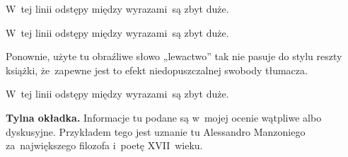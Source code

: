 \documentclass[a4paper,11pt]{article}
\numberwithin{equation}{section}
\begin{document}
\noindent
{} W~tej linii odstępy między wyrazami~są zbyt duże.

\VerSpaceFour





\noindent
{} W~tej linii odstępy między wyrazami~są zbyt duże.

\VerSpaceFour





\noindent
{} Ponownie, użyte tu obraźliwe słowo „lewactwo” tak
nie pasuje do stylu reszty książki, że~zapewne jest to efekt
niedopuszczalnej swobody tłumacza.

\VerSpaceFour





\noindent
{} W~tej linii odstępy między wyrazami~są zbyt duże.

\VerSpaceFour





\noindent
\textbf{Tylna okładka.} Informacje tu podane są w~mojej ocenie wątpliwe
albo dyskusyjne. Przykładem tego jest uznanie tu Alessandro Manzoniego
za~największego filozofa i~poetę XVII~wieku.

\VerSpaceFour





\newpage

\end{document}
